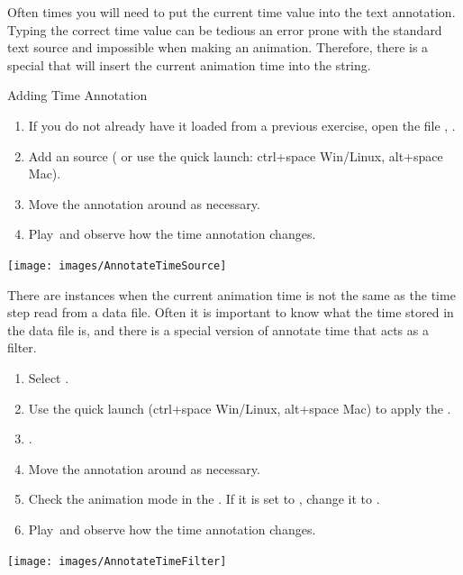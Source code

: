 Often times you will need to put the current time value into the text
annotation.  Typing the correct time value can be tedious an error prone
with the standard text source and impossible when making an animation.
Therefore, there is a special  that will
insert the current animation time into the string.


\begin{exercise}{Adding Time Annotation}
  \label{ex:AddingTimeAnnotation}%
  \begin{enumerate}
  \item If you do not already have it loaded from a previous exercise, open
    the file , \apply.
  \item Add an  source ( \ra {} or use the quick launch: ctrl+space Win/Linux, alt+space Mac).
  \item Move the annotation around as necessary.
  \item Play~\vcrPlay and observe how the time annotation changes.
    \savecounter
  \end{enumerate}

  \begin{inlinefig}
    \texttt{[image: images/AnnotateTimeSource]}
  \end{inlinefig}

  There are instances when the current animation time is not the same as
  the time step read from a data file.  Often it is important to know what
  the time stored in the data file is, and there is a special version of
  annotate time that acts as a filter.


  \begin{enumerate}
    \restorecounter
  \item Select .
  \item Use the quick launch (ctrl+space Win/Linux, alt+space Mac) to apply
    the . 
  \item \apply.
  \item Move the annotation around as necessary.
  \item Check the animation mode in the .  If it is set
    to , change it to .
  \item Play~\vcrPlay and observe how the time annotation changes.
  \end{enumerate}

  \begin{inlinefig}
    \texttt{[image: images/AnnotateTimeFilter]}
  \end{inlinefig}
\end{exercise}


